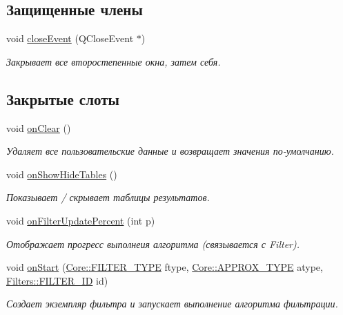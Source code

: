 \subsection*{Защищенные члены}
\begin{DoxyCompactItemize}
\item 
\hypertarget{class_main_window_a38edb88d43e844aca9d2e762c8706565}{}\label{class_main_window_a38edb88d43e844aca9d2e762c8706565} 
void \hyperlink{class_main_window_a38edb88d43e844aca9d2e762c8706565}{close\+Event} (Q\+Close\+Event $\ast$)
\begin{DoxyCompactList}\small\item\em Закрывает все второстепенные окна, затем себя. \end{DoxyCompactList}\end{DoxyCompactItemize}
\subsection*{Закрытые слоты}
\begin{DoxyCompactItemize}
\item 
\hypertarget{class_main_window_ab1db88110806edae5fc7a1d7a24267f7}{}\label{class_main_window_ab1db88110806edae5fc7a1d7a24267f7} 
void \hyperlink{class_main_window_ab1db88110806edae5fc7a1d7a24267f7}{on\+Clear} ()
\begin{DoxyCompactList}\small\item\em Удаляет все пользовательские данные и возвращает значения по-\/умолчанию. \end{DoxyCompactList}\item 
\hypertarget{class_main_window_a2df38aeb37f3c82c5523be3ef2731404}{}\label{class_main_window_a2df38aeb37f3c82c5523be3ef2731404} 
void \hyperlink{class_main_window_a2df38aeb37f3c82c5523be3ef2731404}{on\+Show\+Hide\+Tables} ()
\begin{DoxyCompactList}\small\item\em Показывает / скрывает таблицы результатов. \end{DoxyCompactList}\item 
\hypertarget{class_main_window_aa5a210bb2bc29cb3f7d5d205ae215dbf}{}\label{class_main_window_aa5a210bb2bc29cb3f7d5d205ae215dbf} 
void \hyperlink{class_main_window_aa5a210bb2bc29cb3f7d5d205ae215dbf}{on\+Filter\+Update\+Percent} (int p)
\begin{DoxyCompactList}\small\item\em Отображает прогресс выполнеия алгоритма (связывается с Filter). \end{DoxyCompactList}\item 
void \hyperlink{class_main_window_a16686da6ed1d113106f9dc24694db2b9}{on\+Start} (\hyperlink{namespace_core_af88278693f3c866f217da796f4bb9af7}{Core\+::\+F\+I\+L\+T\+E\+R\+\_\+\+T\+Y\+PE} ftype, \hyperlink{namespace_core_acd67f53ff1d9b21fabb1da4474a8f7d9}{Core\+::\+A\+P\+P\+R\+O\+X\+\_\+\+T\+Y\+PE} atype, \hyperlink{namespace_filters_a1b615faac44ef992d0af44da40ff26d7}{Filters\+::\+F\+I\+L\+T\+E\+R\+\_\+\+ID} id)
\begin{DoxyCompactList}\small\item\em Создает экземпляр фильтра и запускает выполнение алгоритма фильтрации. \end{DoxyCompactList}\end{DoxyCompactItemize}
